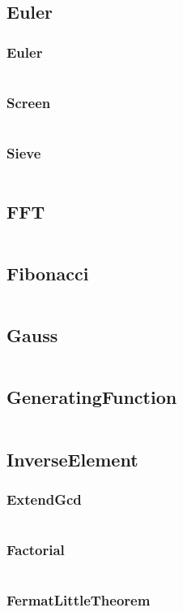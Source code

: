 \documentclass[a4paper,11pt]{article}
\begin{document}
\subsection{Euler}
\subsubsection{Euler}
\inputminted[breaklines]{c++}{02++Math/+Euler/+Euler.cpp}
\subsubsection{Screen}
\inputminted[breaklines]{c++}{02++Math/+Euler/+Screen.cpp}
\subsubsection{Sieve}
\inputminted[breaklines]{c++}{02++Math/+Euler/+Sieve.cpp}

\subsection{FFT}
\inputminted[breaklines]{c++}{02++Math/+FFT.cpp}
\subsection{Fibonacci}
\inputminted[breaklines]{c++}{02++Math/+Fibonacci.cpp}
\subsection{Gauss}
\inputminted[breaklines]{c++}{02++Math/+Gauss.cpp}
\subsection{GeneratingFunction}
\inputminted[breaklines]{c++}{02++Math/+GeneratingFunction.cpp}
\subsection{InverseElement}
\subsubsection{ExtendGcd}
\inputminted[breaklines]{c++}{02++Math/+InverseElement/+ExtendGcd.cpp}
\subsubsection{Factorial}
\inputminted[breaklines]{c++}{02++Math/+InverseElement/+Factorial.cpp}
\subsubsection{FermatLittleTheorem}
\inputminted[breaklines]{c++}{02++Math/+InverseElement/+FermatLittleTheorem.cpp}
\end{document}
